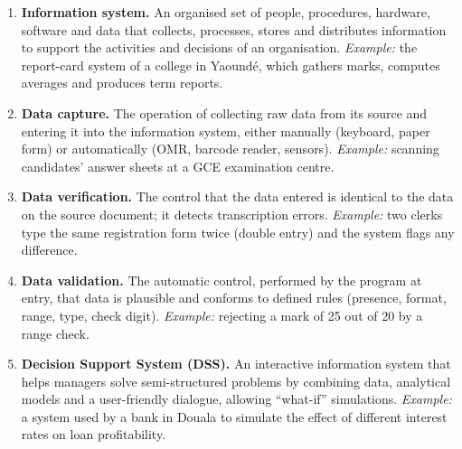 \documentclass[11pt]{article}
\begin{document}
\begin{corrige}
\begin{enumerate}
\item \textbf{Information system.} An organised set of people, procedures, hardware, software and data that collects, processes, stores and distributes information to support the activities and decisions of an organisation. \emph{Example:} the report-card system of a college in Yaoundé, which gathers marks, computes averages and produces term reports.
\item \textbf{Data capture.} The operation of collecting raw data from its source and entering it into the information system, either manually (keyboard, paper form) or automatically (OMR, barcode reader, sensors). \emph{Example:} scanning candidates' answer sheets at a GCE examination centre.
\item \textbf{Data verification.} The control that the data entered is identical to the data on the source document; it detects transcription errors. \emph{Example:} two clerks type the same registration form twice (double entry) and the system flags any difference.
\item \textbf{Data validation.} The automatic control, performed by the program at entry, that data is plausible and conforms to defined rules (presence, format, range, type, check digit). \emph{Example:} rejecting a mark of 25 out of 20 by a range check.
\item \textbf{Decision Support System (DSS).} An interactive information system that helps managers solve semi-structured problems by combining data, analytical models and a user-friendly dialogue, allowing ``what-if'' simulations. \emph{Example:} a system used by a bank in Douala to simulate the effect of different interest rates on loan profitability.
\end{enumerate}
\end{corrige}
\end{document}
